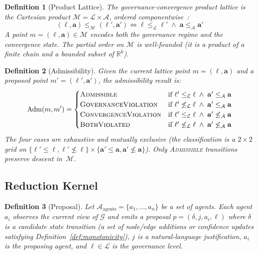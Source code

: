 \documentclass[11pt]{article}
\newtheorem{definition}{Definition}
\begin{document}
\begin{definition}[Product Lattice]
\label{def:product-lattice}
The \emph{governance-convergence product lattice} is the Cartesian product $\mathcal{M} = \mathcal{L} \times \mathcal{A}$, ordered componentwise~\cite{davey2002}:
\[
(\ell, \mathbf{a}) \leq_{\mathcal{M}} (\ell', \mathbf{a}') \iff \ell \leq_{\mathcal{L}} \ell' \;\wedge\; \mathbf{a} \leq_{\mathcal{A}} \mathbf{a}'
\]
A point $m = (\ell, \mathbf{a}) \in \mathcal{M}$ encodes both the governance regime and the convergence state. The partial order on $\mathcal{M}$ is well-founded (it is a product of a finite chain and a bounded subset of $\mathbb{R}^k$).
\end{definition}

\begin{definition}[Admissibility]
\label{def:admissibility}
Given the current lattice point $m = (\ell, \mathbf{a})$ and a proposed point $m' = (\ell', \mathbf{a}')$, the \emph{admissibility result} is:
\[
\mathrm{Adm}(m, m') = \begin{cases}
  \textsc{Admissible}           & \text{if } \ell' \leq_{\mathcal{L}} \ell \;\wedge\; \mathbf{a}' \leq_{\mathcal{A}} \mathbf{a} \\
  \textsc{GovernanceViolation}  & \text{if } \ell' \not\leq_{\mathcal{L}} \ell \;\wedge\; \mathbf{a}' \leq_{\mathcal{A}} \mathbf{a} \\
  \textsc{ConvergenceViolation} & \text{if } \ell' \leq_{\mathcal{L}} \ell \;\wedge\; \mathbf{a}' \not\leq_{\mathcal{A}} \mathbf{a} \\
  \textsc{BothViolated}         & \text{if } \ell' \not\leq_{\mathcal{L}} \ell \;\wedge\; \mathbf{a}' \not\leq_{\mathcal{A}} \mathbf{a}
\end{cases}
\]
The four cases are exhaustive and mutually exclusive (the classification is a $2 \times 2$ grid on $\{\ell' \leq \ell, \ell' \not\leq \ell\} \times \{\mathbf{a}' \leq \mathbf{a}, \mathbf{a}' \not\leq \mathbf{a}\}$). Only \textsc{Admissible} transitions preserve descent in~$\mathcal{M}$.
\end{definition}

\subsection{Reduction Kernel}

\begin{definition}[Proposal]
\label{def:proposal}
Let $\mathcal{A}_{\text{agents}} = \{a_1, \ldots, a_n\}$ be a set of agents. Each agent $a_i$ observes the current view of $\mathcal{G}$ and emits a \emph{proposal} $p = (\delta, j, a_i, \ell)$ where $\delta$ is a candidate state transition (a set of node/edge additions or confidence updates satisfying Definition~\ref{def:monotonicity}), $j$ is a natural-language justification, $a_i$ is the proposing agent, and $\ell \in \mathcal{L}$ is the governance level.
\end{definition}
\end{document}
